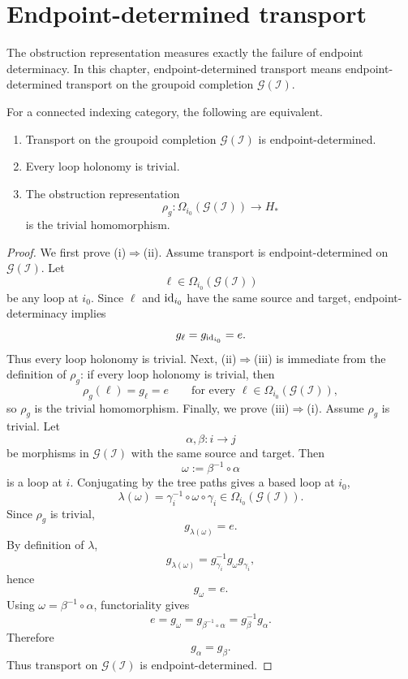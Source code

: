\section{Endpoint-determined transport}
The obstruction representation measures exactly the failure of endpoint
determinacy. In this chapter, endpoint-determined transport means
endpoint-determined transport on the groupoid completion
\(\mathcal G(\mathcal I)\).
\begin{corollary}
	\label{cor:DO-endpoint}
	For a connected indexing category, the following are equivalent.
	\begin{enumerate}
		\item Transport on the groupoid completion \(\mathcal G(\mathcal I)\) is
		      endpoint-determined.
		\item Every loop holonomy is trivial.
		\item The obstruction representation
		      \[
			      \rho_g:\Omega_{i_0}(\mathcal G(\mathcal I))\to H_*
		      \]
		      is the trivial homomorphism.
	\end{enumerate}
\end{corollary}
\begin{proof}
	We first prove \textup{(i)}\(\Rightarrow\)\textup{(ii)}.
	Assume transport is endpoint-determined on \(\mathcal G(\mathcal I)\).
	Let
	\[
		\ell\in \Omega_{i_0}(\mathcal G(\mathcal I))
	\]
	be any loop at \(i_0\). Since \(\ell\) and \(\operatorname{id}_{i_0}\) have the same
	source and target, endpoint-determinacy implies
	\[
		g_\ell=g_{\operatorname{id}_{i_0}}=e.
	\]
	Thus every loop holonomy is trivial.
	Next, \textup{(ii)}\(\Rightarrow\)\textup{(iii)} is immediate from the
	definition of \(\rho_g\): if every loop holonomy is trivial, then
	\[
		\rho_g(\ell)=g_\ell=e
		\qquad
		\text{for every }\ell\in \Omega_{i_0}(\mathcal G(\mathcal I)),
	\]
	so \(\rho_g\) is the trivial homomorphism.
	Finally, we prove \textup{(iii)}\(\Rightarrow\)\textup{(i)}.
	Assume \(\rho_g\) is trivial. Let
	\[
		\alpha,\beta:i\to j
	\]
	be morphisms in \(\mathcal G(\mathcal I)\) with the same source and
	target. Then
	\[
		\omega:=\beta^{-1}\circ \alpha
	\]
	is a loop at \(i\). Conjugating by the tree paths gives a based loop at
	\(i_0\),
	\[
		\lambda(\omega)=\gamma_i^{-1}\circ \omega\circ \gamma_i
		\in
		\Omega_{i_0}(\mathcal G(\mathcal I)).
	\]
	Since \(\rho_g\) is trivial,
	\[
		g_{\lambda(\omega)}=e.
	\]
	By definition of \(\lambda\),
	\[
		g_{\lambda(\omega)}
		=
		g_{\gamma_i}^{-1}g_\omega g_{\gamma_i},
	\]
	hence
	\[
		g_\omega=e.
	\]
	Using \(\omega=\beta^{-1}\circ \alpha\), functoriality gives
	\[
		e=g_\omega=g_{\beta^{-1}\circ \alpha}=g_\beta^{-1}g_\alpha.
	\]
	Therefore
	\[
		g_\alpha=g_\beta.
	\]
	Thus transport on \(\mathcal G(\mathcal I)\) is endpoint-determined.
\end{proof}
